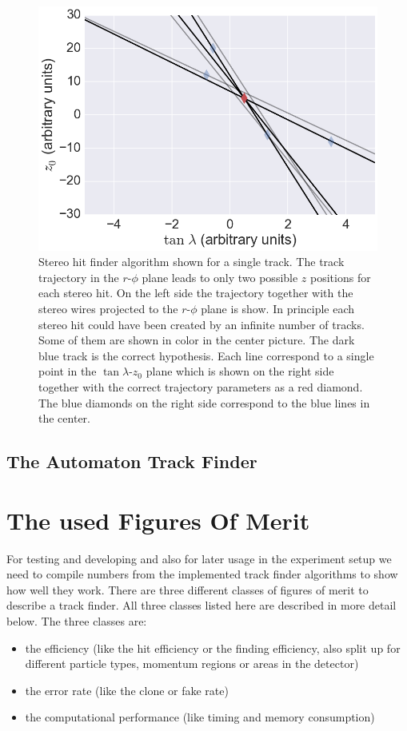 \begin{figure}
 \includegraphics[scale=0.2]{figures/theory/stereo_3.png}
 \caption{Stereo hit finder algorithm shown for a single track. The track trajectory in the $r$-$\phi$ plane leads to only two possible $z$ positions for each stereo hit. On the left side the trajectory together with the stereo wires projected to the $r$-$\phi$ plane is show. In principle each stereo hit could have been created by an infinite number of tracks. Some of them are shown in color in the center picture. The dark blue track is the correct hypothesis. Each line correspond to a single point in the $\tan \lambda$-$z_0$ plane which is shown on the right side together with the correct trajectory parameters as a red diamond. The blue diamonds on the right side correspond to the blue lines in the center.}
 \label{fig-stereo-explained}
\end{figure}


\subsection{The Automaton Track Finder}


\section{The used Figures Of Merit}

For testing and developing and also for later usage in the experiment setup we need to compile numbers from the implemented track finder algorithms to show how well they work. There are three different classes of figures of merit to describe a track finder. All three classes listed here are described in more detail below. The three classes are:
\begin{itemize}
  \item the efficiency (like the hit efficiency or the finding efficiency, also split up for different particle types, momentum regions or areas in the detector)
  \item the error rate (like the clone or fake rate)
  \item the computational performance (like timing and memory consumption)
\end{itemize}

